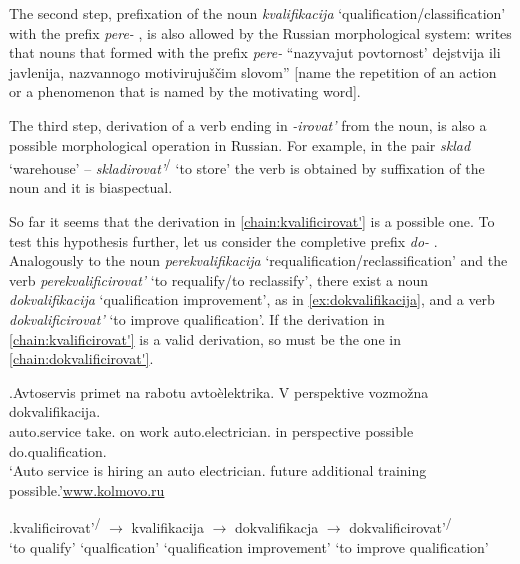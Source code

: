 The second step, prefixation  of the noun \textit{kvalifikacija} `qualification\slash classifica\-tion' with the prefix \textit{pere-}  , is also allowed by the Russian morphological system: \citet[226]{Shvedova:82} writes that nouns that formed with the prefix \textit{pere-}   ``nazyvajut povtornost' dejstvija ili javlenija, nazvannogo motiviruju\v{s}\v{c}im slovom'' [name the repetition  of an action or a phenomenon that is named by the motivating word].

The third step, derivation of a verb ending in \textit{-irovat'} from the noun, is also a possible morphological operation  in Russian. For example, in the pair \textit{sklad} `warehouse' -- \textit{skladirovat'}\textsuperscript{\PF\slash\IPF} `to store' the verb is obtained by suffixation   of the noun and it is biaspectual.

So far it seems that the derivation in \ref{chain:kvalificirovat'} is a possible one. To test this hypothesis further, let us consider the completive  prefix \textit{do-}  . Analogously to the noun \textit{perekvalifikacija} `requalification/reclassification' and the verb \textit{perekvalificirovat'} `to requalify/to reclassify', there exist a noun \textit{dokvalifikacija} `qualification improvement', as in \ref{ex:dokvalifikacija}, and a verb \textit{dokvalificirovat'} `to improve qualification'. If the derivation in \ref{chain:kvalificirovat'} is a valid derivation, so must be the one in \ref{chain:dokvalificirovat'}.

\exg.\label{ex:dokvalifikacija}Avtoservis primet na rabotu avto\`{e}lektrika. V perspektive vozmo\v{z}na dokvalifikacija.\\
{auto.service} take. on work {auto.electrician.} in perspective possible do.qualification.\\
\trans `Auto service is hiring an auto electrician. future  additional training possible.'\hbox{}\hfill\hbox{\url{www.kolmovo.ru}}

\exg.\label{chain:dokvalificirovat'}kvalificirovat'\textsuperscript{\PF\slash\IPF} {$\rightarrow$} kvalifikacija {$\rightarrow$} dokvalifikacja {$\rightarrow$} dokvalificirovat'\textsuperscript{\PF\slash\IPF}\\
{`to qualify'} {} {`qualfication'} {} {`qualification improvement'} {} {`to improve qualification'}\\

